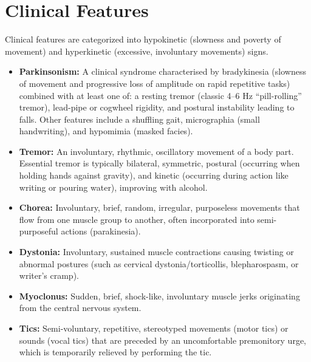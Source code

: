 \section*{Clinical Features}
Clinical features are categorized into hypokinetic (slowness and poverty of movement) and hyperkinetic (excessive, involuntary movements) signs.
\begin{itemize}
    \item \textbf{Parkinsonism:} A clinical syndrome characterised by bradykinesia (slowness of movement and progressive loss of amplitude on rapid repetitive tasks) combined with at least one of: a resting tremor (classic 4--6 Hz ``pill-rolling'' tremor), lead-pipe or cogwheel rigidity, and postural instability leading to falls. Other features include a shuffling gait, micrographia (small handwriting), and hypomimia (masked facies).
    \item \textbf{Tremor:} An involuntary, rhythmic, oscillatory movement of a body part. Essential tremor is typically bilateral, symmetric, postural (occurring when holding hands against gravity), and kinetic (occurring during action like writing or pouring water), improving with alcohol.
    \item \textbf{Chorea:} Involuntary, brief, random, irregular, purposeless movements that flow from one muscle group to another, often incorporated into semi-purposeful actions (parakinesia).
    \item \textbf{Dystonia:} Involuntary, sustained muscle contractions causing twisting or abnormal postures (such as cervical dystonia/torticollis, blepharospasm, or writer's cramp).
    \item \textbf{Myoclonus:} Sudden, brief, shock-like, involuntary muscle jerks originating from the central nervous system.
    \item \textbf{Tics:} Semi-voluntary, repetitive, stereotyped movements (motor tics) or sounds (vocal tics) that are preceded by an uncomfortable premonitory urge, which is temporarily relieved by performing the tic.
\end{itemize}

